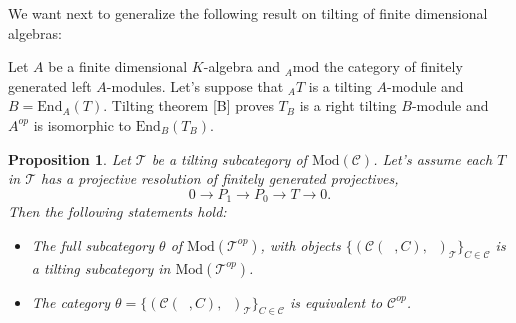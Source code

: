 \documentclass{amsart}
\theoremstyle{plain}
\newtheorem{proposition}{Proposition}
\numberwithin{equation}{section}
\begin{document}
We want next to generalize the following result on tilting of finite
dimensional algebras:

Let $A$ be a finite dimensional $K$-algebra and $_{A}\mathrm{mod}$ the
category of finitely generated left $A$-modules. Let's suppose that $_{A}T$
is a tilting $A$-module and $B=\mathrm{End}_{A}(T)$. Tilting theorem [B]
proves $T_{B}$ is a right tilting $B$-module and $A^{op}$ is isomorphic to $\mathrm{End}_{B}(T_{B})$.

\begin{proposition}
\label{TT} Let $\mathcal{T}$ be a tilting subcategory of $\mathrm{Mod}(\mathcal{C})$. Let's assume each $T$ in $\mathcal{T}$ has a projective
resolution of finitely generated projectives,
\begin{equation*}
0\rightarrow P_{1}\rightarrow P_{0}\rightarrow T\rightarrow 0\text{.}
\end{equation*}Then the following statements hold:

\begin{itemize}
\item[(a)] The full subcategory $\theta $ of $\mathrm{\mathrm{Mod}}(\mathcal{T}^{op})$, with objects $\{(\mathcal{C}(\;\;,C),\;\;)_{\mathcal{T}}\}_{C\in
\mathcal{C}}$ is a tilting subcategory in $\mathrm{\mathrm{Mod}}(\mathcal{T}^{op})$.

\item[(b)] The category $\theta =\{(\mathcal{C}(\;\;,C),\;\;)_{\mathcal{T}}\}_{C\in \mathcal{C}}$ is equivalent to $\mathcal{C}^{op}$.
\end{itemize}
\end{proposition}
\end{document}
